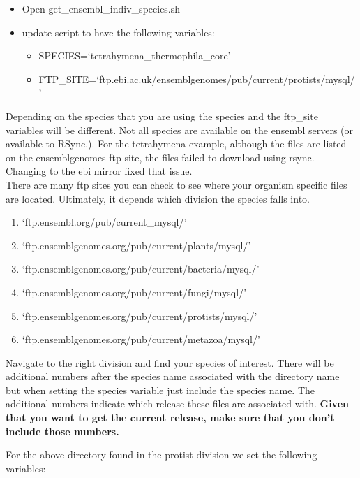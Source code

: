 \documentclass[]{book}
\providecommand{\tightlist}{%
  \setlength{\itemsep}{0pt}\setlength{\parskip}{0pt}}
\begin{document}
\begin{itemize}
\tightlist
\item
  Open get\_ensembl\_indiv\_species.sh
\item
  update script to have the following variables:

  \begin{itemize}
  \tightlist
  \item
    SPECIES=`tetrahymena\_thermophila\_core'
  \item
    FTP\_SITE=`ftp.ebi.ac.uk/ensemblgenomes/pub/current/protists/mysql/'
  \end{itemize}
\end{itemize}

Depending on the species that you are using the species and the
ftp\_site variables will be different. Not all species are available on
the ensembl servers (or available to RSync.). For the tetrahymena
example, although the files are listed on the ensemblgenomes ftp site,
the files failed to download using rsync. Changing to the ebi mirror
fixed that issue.\\
There are many ftp sites you can check to see where your organism
specific files are located. Ultimately, it depends which division the
species falls into.

\begin{enumerate}
\def\labelenumi{\arabic{enumi}.}
\tightlist
\item
  `ftp.ensembl.org/pub/current\_mysql/'
\item
  `ftp.ensemblgenomes.org/pub/current/plants/mysql/'
\item
  `ftp.ensemblgenomes.org/pub/current/bacteria/mysql/'
\item
  `ftp.ensemblgenomes.org/pub/current/fungi/mysql/'
\item
  `ftp.ensemblgenomes.org/pub/current/protists/mysql/'
\item
  `ftp.ensemblgenomes.org/pub/current/metazoa/mysql/'
\end{enumerate}

Navigate to the right division and find your species of interest. There
will be additional numbers after the species name associated with the
directory name but when setting the species variable just include the
species name. The additional numbers indicate which release these files
are associated with. \textbf{Given that you want to get the current
release, make sure that you don't include those numbers.}

For the above directory found in the protist division we set the
following variables:
\end{document}
